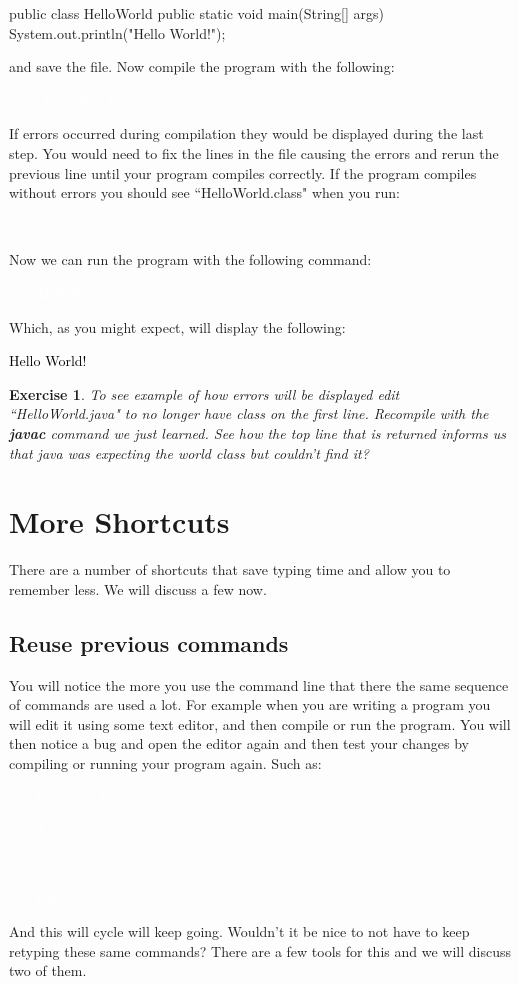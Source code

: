 \documentclass[oneside]{book}
\newcommand{\commandline}[1]{\begin{center} \colorbox{Dark}{\textcolor{white}{#1}} \end{center}}
\newcommand{\exampleout}[1]{\begin{center} \colorbox{Light}{\textcolor{black}{#1}} \end{center}}
\newtheorem{ex}{Exercise}[chapter]
\begin{document}
\begin{verbatimtab}
    public class HelloWorld {
        public static void main(String[] args) {
            System.out.println("Hello World!");
        }
    }
\end{verbatimtab}
and save the file. Now compile the program with the following:
\commandline{javac HelloWorld.java}
If errors occurred during compilation they would be displayed during the last step. You would need to fix the lines in the file causing the errors and rerun the previous line until your program compiles correctly. If the program compiles without errors you should see ``HelloWorld.class" when you run:
\commandline{ls}
Now we can run the program with the following command:
\commandline{java HelloWorld}
Which, as you might expect, will display the following:
\exampleout{Hello World!}

\vspace{0.5cm}

\begin{ex}
    To see example of how errors will be displayed edit ``HelloWorld.java" to no longer have class on the first line. Recompile with the \textbf{javac} command we just learned. See how the top line that is returned informs us that java was expecting the world class but couldn't find it?
\end{ex}

\newpage
\section{More Shortcuts}
There are a number of shortcuts that save typing time and allow you to remember less. We will discuss a few now.
\subsection{Reuse previous commands}
You will notice the more you use the command line that there the same sequence of commands are used a lot. For example when you are writing a program you will edit it using some text editor, and then compile or run the program. You will then notice a bug and open the editor again and then test your changes by compiling or running your program again. Such as:
\commandline{vim HelloWorld.c}
\commandline{gcc HelloWorld.c}
\commandline{./a.out}
\commandline{vim HelloWorld.c}
And this will cycle will keep going. Wouldn't it be nice to not have to keep retyping these same commands? There are a few tools for this and we will discuss two of them. 
\end{document}
